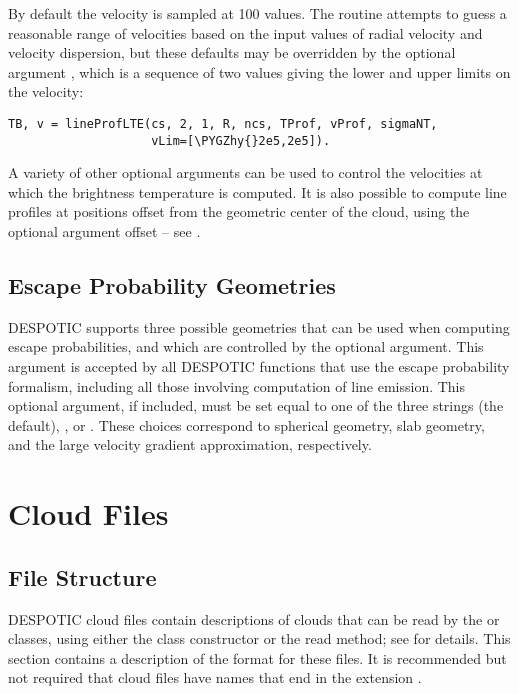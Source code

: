 \documentclass[letterpaper,10pt,english]{sphinxmanual}
\def\PYGZhy{\char`\-}
\begin{document}
By default the velocity is sampled at 100 values. The routine attempts
to guess a reasonable range of velocities based on the input values of
radial velocity and velocity dispersion, but these defaults may be
overridden by the optional argument , which is a sequence of
two values giving the lower and upper limits on the velocity:

\begin{Verbatim}[commandchars=\\\{\}]
TB, v = lineProfLTE(cs, 2, 1, R, ncs, TProf, vProf, sigmaNT,
                    vLim=[\PYGZhy{}2e5,2e5]).
\end{Verbatim}

A variety of other optional arguments can be used to control the
velocities at which the brightness temperature is computed. It is also
possible to compute line profiles at positions offset from the
geometric center of the cloud, using the optional argument offset --
see {\hyperref[fulldoc:sssec-full-lineproflte]{\emph{}}}.


\section{Escape Probability Geometries}
\label{functions:escape-probability-geometries}
DESPOTIC supports three possible geometries that can be used when
computing escape probabilities, and which are controlled by the
 optional argument. This argument is accepted by all
DESPOTIC functions that use the escape probability formalism,
including all those involving computation of line emission. This
optional argument, if included, must be set equal to one of the three
strings  (the default), , or . These choices
correspond to spherical geometry, slab geometry, and the large
velocity gradient approximation, respectively.


\chapter{Cloud Files}
\label{cloudfiles:sec-cloudfiles}\label{cloudfiles::doc}\label{cloudfiles:cloud-files}

\section{File Structure}
\label{cloudfiles:file-structure}
DESPOTIC cloud files contain descriptions of clouds that can be read
by the  or  classes, using either the class
constructor or the read method; see {\hyperref[fulldoc:sssec-full-cloud]{\emph{}}} for
details. This section contains a description of the format for these
files. It is recommended but not required that cloud files have names
that end in the extension .
\end{document}
